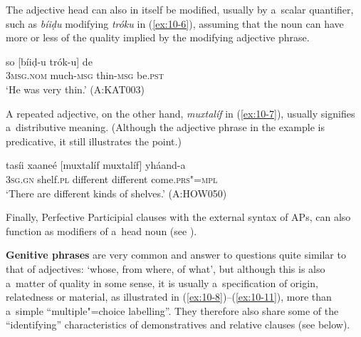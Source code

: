 The adjective head can also in itself be modified, usually by a~scalar quantifier, such as \textit{bíiḍu} modifying \textit{tróku} in (\ref{ex:10-6}), assuming that the noun can have more or less of the quality implied by the modifying adjective phrase. 

\begin{exe}
\ex
\label{ex:10-6}
\gll so [bíiḍ-u trók-u] de \\
\textsc{3msg.nom} much-\textsc{msg} thin-\textsc{msg} be.\textsc{pst} \\
\glt `He was very thin.' (A:KAT003)
\end{exe}

A repeated adjective, on the other hand, \textit{muxtalíf} in (\ref{ex:10-7}), usually signifies a~distributive meaning. (Although the adjective phrase in the example is predicative, it still illustrates the point.)

\begin{exe}
\ex
\label{ex:10-7}
\gll tasíi xaaneé [muxtalíf muxtalíf] yháand-a \\
\textsc{3sg.gn} shelf.\textsc{pl} different different come.\textsc{prs"=mpl} \\
\glt `There are different kinds of shelves.' (A:HOW050)
\end{exe}

Finally, Perfective Participial clauses with the external syntax of APs, can also function as modifiers of a~head noun (see ). 


\textbf{Genitive phrases} are very common and answer to questions quite similar to that of
adjectives: `whose, from where, of what', but although this is also a~matter of quality in some
sense, it is usually a~specification of origin, relatedness or material, as illustrated in
(\ref{ex:10-8})--(\ref{ex:10-11}), more than a~simple ``multiple"=choice labelling''. They therefore
also share some of the ``identifying'' characteristics of demonstratives and relative clauses (see
below).

